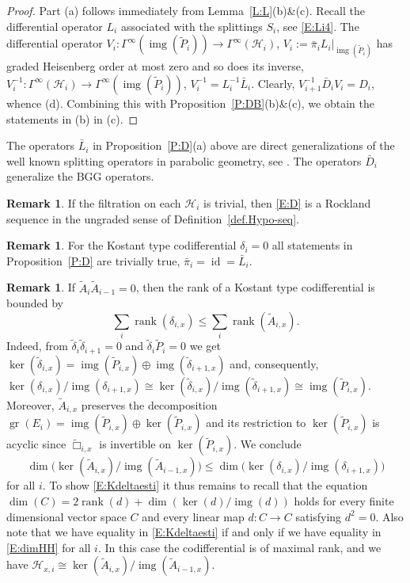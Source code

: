 \documentclass[reqno,12pt]{amsart}
\DeclareMathOperator{\img}{img}
\DeclareMathOperator{\gr}{gr}
\DeclareMathOperator{\rank}{rank}
\DeclareMathOperator{\id}{id}
\theoremstyle{plain}
\theoremstyle{definition}
\newtheorem{remark}[theorem]{Remark}
\begin{document}
\begin{proof}
Part (a) follows immediately from Lemma~\ref{L:L}(b)\&(c).
Recall the differential operator $L_i$ associated with the splittings $S_i$, see \eqref{E:Li4}.
The differential operator $V_i\colon\Gamma^\infty(\img(\tilde P_i))\to\Gamma^\infty(\mathcal H_i)$, $V_i:=\bar\pi_iL_i|_{\img(\tilde P_i)}$ has graded Heisenberg order at most zero and so does its inverse, $V_i^{-1}\colon\Gamma^\infty(\mathcal H_i)\to\Gamma^\infty(\img(\tilde P_i))$, $V_i^{-1}=L_i^{-1}\bar L_i$.
Clearly, $V_{i+1}^{-1}\bar D_iV_i=D_i$, whence (d).
Combining this with Proposition~\ref{P:DB}(b)\&(c), we obtain the statements in (b) in (c).
\end{proof}


The operators $\bar L_i$ in Proposition~\ref{P:D}(a) above are direct generalizations of the well known splitting operators in parabolic geometry, see \cite[Theorem~2.4]{CS12}.
The operators $\bar D_i$ generalize the BGG operators.

\begin{remark}
If the filtration on each $\mathcal H_i$ is trivial, then \eqref{E:D} is a Rockland sequence in the ungraded sense of Definition~\ref{def.Hypo-seq}.
\end{remark}


\begin{remark}
For the Kostant type codifferential $\delta_i=0$ all statements in Proposition~\ref{P:D} are trivially true, $\bar\pi_i=\id=\bar L_i$. 
\end{remark}


\begin{remark}\label{R:Kdeltabound}
If $\tilde A_i\tilde A_{i-1}=0$, then the rank of a Kostant type codifferential is bounded by
\begin{equation}\label{E:Kdeltaesti}
\sum_i\rank(\delta_{i,x})\leq\sum_i\rank(\tilde A_{i,x}).
\end{equation}
Indeed, from $\tilde\delta_i\tilde\delta_{i+1}=0$ and $\tilde\delta_i\tilde P_i=0$ we get $\ker(\tilde\delta_{i,x})=\img(\tilde P_{i,x})\oplus\img(\tilde\delta_{i+1,x})$ and, consequently, $\ker(\delta_{i,x})/\img(\delta_{i+1,x})\cong\ker(\tilde\delta_{i,x})/\img(\tilde\delta_{i+1,x})\cong\img(\tilde P_{i,x})$.
Moreover, $\tilde A_{i,x}$ preserves the decomposition $\gr(E_i)=\img(\tilde P_{i,x})\oplus\ker(\tilde P_{i,x})$ and its restriction to $\ker(\tilde P_{i,x})$ is acyclic since $\tilde\Box_{i,x}$ is invertible on $\ker(\tilde P_{i,x})$.
We conclude 
\begin{equation}\label{E:dimHH}
\dim\bigl(\ker(\tilde A_{i,x})/\img(\tilde A_{i-1,x})\bigr)
\leq\dim\bigl(\ker(\delta_{i,x})/\img(\delta_{i+1,x})\bigr)
\end{equation}
for all $i$.
To show \eqref{E:Kdeltaesti} it thus remains to recall that the equation $\dim(C)=2\rank(d)+\dim(\ker(d)/\img(d))$ holds for every finite dimensional vector space $C$ and every linear map $d\colon C\to C$ satisfying $d^2=0$.
Also note that we have equality in \eqref{E:Kdeltaesti} if and only if we have equality in \eqref{E:dimHH} for all $i$.
In this case the codifferential is of maximal rank, and we have $\mathcal H_{x,i}\cong\ker(\tilde A_{i,x})/\img(\tilde A_{i-1,x})$.
\end{remark}
\end{document}
